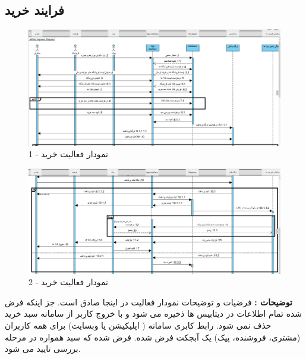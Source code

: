 \documentclass[12pt,a4paper]{article}
\begin{document}
	\subsection{فرایند خرید} \label{section.sequence.buy}
		\begin{figure}[h!]
			\begin{center}
				\includegraphics[width=14cm]{images/Buy Sequence Diagram 1.png}
			\end{center}
			\caption{نمودار فعالیت خرید - 1}
		\end{figure}
		\begin{figure}[h!]
		\begin{center}
			\includegraphics[width=14cm]{images/Buy Sequence Diagram 2.png}
		\end{center}
		\caption{نمودار فعالیت خرید - 2}
		\end{figure}
	
	\textbf{توضیحات :}
	فرضیات و توضیحات نمودار فعالیت در اینجا صادق است. جز اینکه فرض شده تمام اطلاعات در دیتابیس ها ذخیره می شود و با خروج کاربر از سامانه سبد خرید حذف نمی شود.
	رابط کابری سامانه (  اپلیکیشن یا وبسایت) برای همه کاربران (مشتری، فروشنده، پیک) یک آبجکت فرض شده.
	فرض شده که سبد همواره در مرحله بررسی تایید می شود.
	
	\pagebreak
\end{document}
